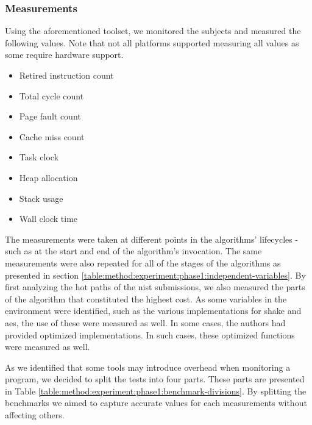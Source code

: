 \subsubsection{Measurements}
\label{section:method:experiment:phase1:measurements}

Using the aforementioned toolset, we monitored the subjects and measured the following values. Note that not all platforms supported measuring all values as some require hardware support.

\begin{itemize}
    \item Retired instruction count
    \item Total cycle count
    \item Page fault count
    \item Cache miss count
    \item Task clock
    \item Heap allocation
    \item Stack usage
    \item Wall clock time
\end{itemize}

The measurements were taken at different points in the algorithms' lifecycles - such as at the start and end of the algorithm's invocation. The same measurements were also repeated for all of the stages of the algorithms as presented in section \ref{table:method:experiment:phase1:independent-variables}. By first analyzing the hot paths of the \gls{nist} submissions, we also measured the parts of the algorithm that constituted the highest cost. As some variables in the environment were identified, such as the various implementations for \gls{shake} and \gls{aes}, the use of these were measured as well. In some cases, the authors had provided optimized implementations. In such cases, these optimized functions were measured as well.

As we identified that some tools may introduce overhead when monitoring a program, we decided to split the tests into four parts. These parts are presented in Table \ref{table:method:experiment:phase1:benchmark-divisions}. By splitting the benchmarks we aimed to capture accurate values for each measurements without affecting others.

